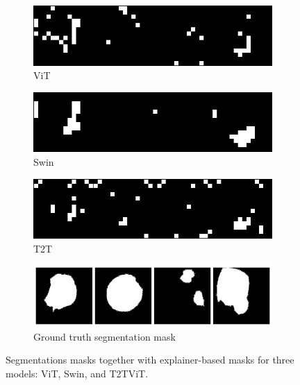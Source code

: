 \documentclass[en]{pracamgr}
\begin{document}
\begin{figure}
\centering
\begin{subfigure}{0.55\textwidth}
   \includegraphics[width=1\linewidth]{./images/gastro_segmentation_vit_2.png}
   \caption{ViT}
\end{subfigure}
\begin{subfigure}{0.55\textwidth}
   \includegraphics[width=1\linewidth]{./images/gastro_segmentation_swin_2.png}
   \caption{Swin}
\end{subfigure}
\begin{subfigure}{0.55\textwidth}
   \includegraphics[width=1\linewidth]{./images/gastro_segmentation_t2t_vit_2.png}
   \caption{T2T}
\end{subfigure}
\begin{subfigure}{0.55\textwidth}
   \includegraphics[width=1\linewidth]{./images/gastro_segmentation_2.png}
   \caption{Ground truth segmentation mask}
\end{subfigure}
\caption{Segmentations masks together with explainer-based masks for three models: ViT, Swin, and T2T\textunderscore ViT.}
\label{segm_exp_2}
\end{figure}
\end{document}
